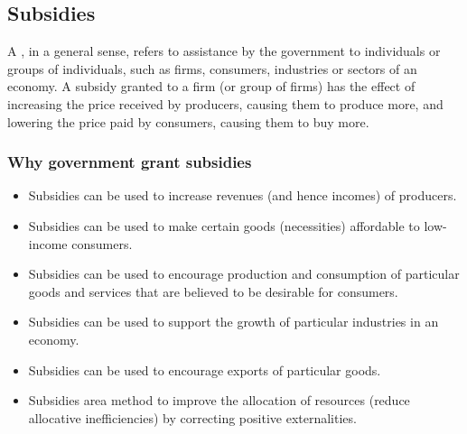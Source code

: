 \subsection{Subsidies}
A , in a general sense, refers to assistance by the government to individuals or groups of individuals, such as firms, consumers, industries or sectors of an economy.
A subsidy granted to a firm (or group of firms) has the effect of increasing the price received by producers, causing them to produce more, and lowering the price paid by consumers, causing them to buy more.
\subsubsection*{Why government grant subsidies}
\begin{itemize}
  \item Subsidies can be used to increase revenues (and hence incomes) of producers.
  \item Subsidies can be used to make certain goods (necessities) affordable to low-income consumers.
  \item Subsidies can be used to encourage production and consumption of particular goods and services that are believed to be desirable for consumers.
  \item Subsidies can be used to support the growth of particular industries in an economy.  
  \item Subsidies can be used to encourage exports of particular goods.
  \item Subsidies area method to improve the allocation of resources (reduce allocative inefficiencies) by correcting positive externalities.
\end{itemize}

